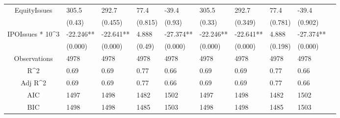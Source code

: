 \documentclass{article}
\begin{document}
\begin{table}[H]
\begin{tabular}{|clllllllll|}
  EquityIssues & 305.5 & 292.7 & 77.4 & -39.4 & 305.5 & 292.7 & 77.4 & -39.4 & \\ 
   & (0.43) & (0.455) & (0.815) & (0.93) & (0.33) & (0.349) & (0.781) & (0.902) & \\ 
  IPOIssues * 10^3 & -22.246** & -22.641** & 4.888 & -27.374** & -22.246** & -22.641** & 4.888 & -27.374** & \\ 
   & (0.000) & (0.000) & (0.49) & (0.000) & (0.000) & (0.000) & (0.198) & (0.000) & \\ 
  \hline 
 Observations & 4978 & 4978 & 4978 & 4978 & 4978 & 4978 & 4978 & 4978 & \\ 
  R^2 & 0.69 & 0.69 & 0.77 & 0.66 & 0.69 & 0.69 & 0.77 & 0.66 & \\ 
  Adj R^2 & 0.69 & 0.69 & 0.77 & 0.66 & 0.69 & 0.69 & 0.77 & 0.66 & \\ 
  AIC & 1497 & 1498 & 1482 & 1502 & 1497 & 1498 & 1482 & 1502 & \\ 
  BIC & 1498 & 1498 & 1485 & 1503 & 1498 & 1498 & 1485 & 1503 & \\ 
   \hline
\end{tabular}
 
\end{table}
\end{document}
